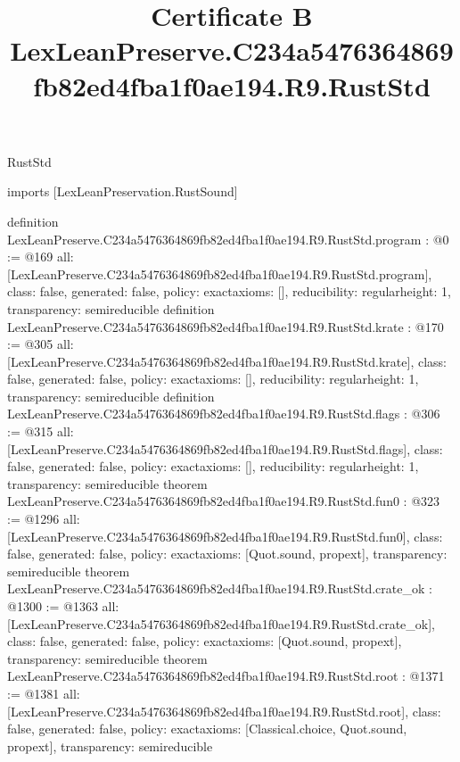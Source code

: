 \begin{lexlean}{RustStd}
\title{Certificate B LexLeanPreserve.C234a5476364869fb82ed4fba1f0ae194.R9.RustStd}
\begin{coremodule}
imports [LexLeanPreservation.RustSound]

definition LexLeanPreserve.C234a5476364869fb82ed4fba1f0ae194.R9.RustStd.program : @0 := @169 {
  all: [LexLeanPreserve.C234a5476364869fb82ed4fba1f0ae194.R9.RustStd.program],
  class: false,
  generated: false,
  policy: exact{axioms: []},
  reducibility: regular{height: 1},
  transparency: semireducible
}
definition LexLeanPreserve.C234a5476364869fb82ed4fba1f0ae194.R9.RustStd.krate : @170 := @305 {
  all: [LexLeanPreserve.C234a5476364869fb82ed4fba1f0ae194.R9.RustStd.krate],
  class: false,
  generated: false,
  policy: exact{axioms: []},
  reducibility: regular{height: 1},
  transparency: semireducible
}
definition LexLeanPreserve.C234a5476364869fb82ed4fba1f0ae194.R9.RustStd.flags : @306 := @315 {
  all: [LexLeanPreserve.C234a5476364869fb82ed4fba1f0ae194.R9.RustStd.flags],
  class: false,
  generated: false,
  policy: exact{axioms: []},
  reducibility: regular{height: 1},
  transparency: semireducible
}
theorem LexLeanPreserve.C234a5476364869fb82ed4fba1f0ae194.R9.RustStd.fun0 : @323 := @1296 {
  all: [LexLeanPreserve.C234a5476364869fb82ed4fba1f0ae194.R9.RustStd.fun0],
  class: false,
  generated: false,
  policy: exact{axioms: [Quot.sound, propext]},
  transparency: semireducible
}
theorem LexLeanPreserve.C234a5476364869fb82ed4fba1f0ae194.R9.RustStd.crate_ok : @1300 := @1363 {
  all: [LexLeanPreserve.C234a5476364869fb82ed4fba1f0ae194.R9.RustStd.crate_ok],
  class: false,
  generated: false,
  policy: exact{axioms: [Quot.sound, propext]},
  transparency: semireducible
}
theorem LexLeanPreserve.C234a5476364869fb82ed4fba1f0ae194.R9.RustStd.root : @1371 := @1381 {
  all: [LexLeanPreserve.C234a5476364869fb82ed4fba1f0ae194.R9.RustStd.root],
  class: false,
  generated: false,
  policy: exact{axioms: [Classical.choice, Quot.sound, propext]},
  transparency: semireducible
}


\end{coremodule}
\end{lexlean}
